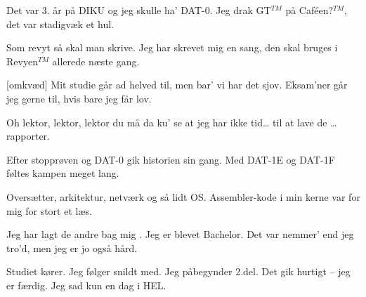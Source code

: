 \documentclass[a4paper]{article}
\begin{document}

\begin{song}
  Det var 3. år på DIKU og jeg skulle ha' DAT-0.
  Jeg drak GT$^{TM}$ på Caf\'een?$^{TM}$, det var stadigvæk et hul.

  Som revyt så skal man skrive. Jeg har skrevet mig en sang,
  den skal bruges i Revyen$^{TM}$ allerede næste gang.

  [omkvæd]
  Mit studie går ad helved til, men bar' vi har det sjov.
  Eksam'ner går jeg gerne til, hvis bare jeg får lov.
  
  Oh lektor, lektor, lektor du må da ku' se
  at jeg har ikke tid\ldots{}
  til at lave de \ldots rapporter.
\end{song}


\begin{song}[Kapitalismen]
  Efter stopprøven og DAT-0
  gik historien sin gang.
  Med DAT-1E og DAT-1F
  føltes kampen meget lang.

  Oversætter, arkitektur,
  netværk og så lidt OS.
  Assembler-kode i min kerne
  var for mig for stort et læs.
\end{song}


\begin{song}
  Jeg har lagt de andre bag mig .
  Jeg er blevet Bachelor.
  Det var nemmer' end jeg tro'd,
  men jeg er jo også hård.

  Studiet kører. Jeg følger snildt med.
  Jeg påbegynder 2.del.
  Det gik hurtigt -- jeg er færdig.
  Jeg sad kun en dag i HEL.
\end{song}

\end{document}
